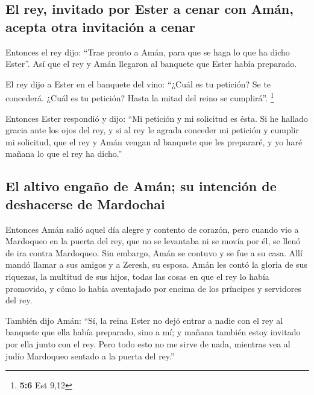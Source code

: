 \hypertarget{el-rey-invitado-por-ester-a-cenar-con-amuxe1n-acepta-otra-invitaciuxf3n-a-cenar}{%
\subsection{El rey, invitado por Ester a cenar con Amán, acepta otra
invitación a
cenar}\label{el-rey-invitado-por-ester-a-cenar-con-amuxe1n-acepta-otra-invitaciuxf3n-a-cenar}}

 Entonces el rey dijo: ``Trae pronto a Amán, para que se
haga lo que ha dicho Ester''. Así que el rey y Amán llegaron al banquete
que Ester había preparado.

 El rey dijo a Ester en el banquete del vino: ``¿Cuál es
tu petición? Se te concederá. ¿Cuál es tu petición? Hasta la mitad del
reino se cumplirá''. \footnote{\textbf{5:6} Est 9,12}

 Entonces Ester respondió y dijo: ``Mi petición y mi
solicitud es ésta.  Si he hallado gracia ante los ojos del
rey, y si al rey le agrada conceder mi petición y cumplir mi solicitud,
que el rey y Amán vengan al banquete que les prepararé, y yo haré mañana
lo que el rey ha dicho.''

\hypertarget{el-altivo-engauxf1o-de-amuxe1n-su-intenciuxf3n-de-deshacerse-de-mardochai}{%
\subsection{El altivo engaño de Amán; su intención de deshacerse de
Mardochai}\label{el-altivo-engauxf1o-de-amuxe1n-su-intenciuxf3n-de-deshacerse-de-mardochai}}

 Entonces Amán salió aquel día alegre y contento de
corazón, pero cuando vio a Mardoqueo en la puerta del rey, que no se
levantaba ni se movía por él, se llenó de ira contra Mardoqueo.
 Sin embargo, Amán se contuvo y se fue a su casa. Allí
mandó llamar a sus amigos y a Zeresh, su esposa.  Amán
les contó la gloria de sus riquezas, la multitud de sus hijos, todas las
cosas en que el rey lo había promovido, y cómo lo había aventajado por
encima de los príncipes y servidores del rey.

 También dijo Amán: ``Sí, la reina Ester no dejó entrar a
nadie con el rey al banquete que ella había preparado, sino a mí; y
mañana también estoy invitado por ella junto con el rey. 
Pero todo esto no me sirve de nada, mientras vea al judío Mardoqueo
sentado a la puerta del rey.''

